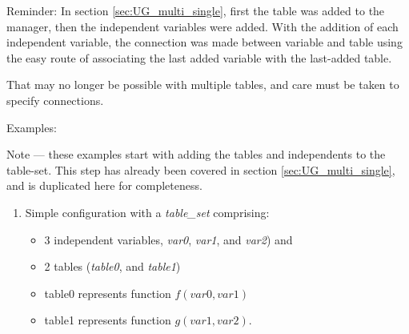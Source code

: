 \documentclass[11pt,fleqn]{report}
\begin{document}
Reminder: In section \ref{sec:UG_multi_single}, first the table was added
to the manager, then the independent variables were added.
With the addition of
each independent variable, the connection was made between variable and
table using the easy route of associating the last added variable with the
last-added table.

That may no longer be possible with multiple tables, and care must be
taken to specify connections.


Examples:

Note --- these examples start with adding the tables and
 independents to the table-set.
This step has already been covered in section \ref{sec:UG_multi_single},
and is duplicated here for completeness.
\begin{enumerate}
 \item Simple configuration with a \textit{table\_set} comprising:
\begin{itemize}
 \item 3 independent variables,
  \textit{var0}, \textit{var1}, and \textit{var2}) and
 \item 2 tables
 (\textit{table0}, and \textit{table1})
 \item table0 represents function $f(var0, var1)$
 \item table1 represents function $g(var1, var2)$.
\end{itemize}


\end{enumerate}
\end{document}
